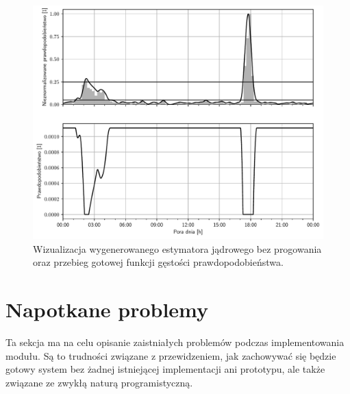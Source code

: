 \begin{figure}[H]
    \centering\includegraphics[width=1.00\textwidth]{img/transformation.pdf}
    \caption{Wizualizacja wygenerowanego estymatora jądrowego bez progowania oraz przebieg gotowej funkcji gęstości prawdopodobieństwa.} \label{fig:transform}
\end{figure}

\section{Napotkane problemy}
Ta sekcja ma na celu opisanie zaistniałych problemów podczas implementowania modułu. Są to trudności związane z przewidzeniem, jak zachowywać się będzie gotowy system bez żadnej istniejącej implementacji ani prototypu, ale także związane ze zwykłą naturą programistyczną.


